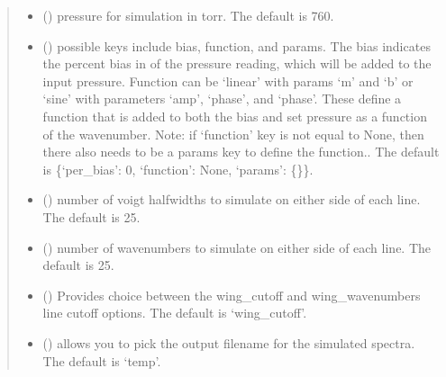 \documentclass[letterpaper,10pt,english]{sphinxmanual}
\begin{document}
\begin{fulllineitems}
\begin{quote}
\begin{description}
\begin{itemize}
\item {} 
\sphinxAtStartPar
{} (\sphinxstyleliteralemphasis{\sphinxupquote{, }}) \textendash{} pressure for simulation in torr. The default is 760.

\item {} 
\sphinxAtStartPar
{} (\sphinxstyleliteralemphasis{\sphinxupquote{, }}) \textendash{} possible keys include bias, function, and params. The bias indicates the percent bias in of the pressure reading, which will be added to the input pressure. Function can be ‘linear’ with params ‘m’ and ‘b’ or ‘sine’ with parameters ‘amp’, ‘phase’, and ‘phase’. These define a function that is added to both the bias and set pressure as a function of the wavenumber. Note: if ‘function’ key is not equal to None, then there also needs to be a params key to define the function.. The default is \{‘per\_bias’: 0, ‘function’: None, ‘params’: \{\}\}.

\item {} 
\sphinxAtStartPar
{} (\sphinxstyleliteralemphasis{\sphinxupquote{, }}) \textendash{} number of voigt half\sphinxhyphen{}widths to simulate on either side of each line. The default is 25.

\item {} 
\sphinxAtStartPar
{} (\sphinxstyleliteralemphasis{\sphinxupquote{, }}) \textendash{} number of wavenumbers to simulate on either side of each line. The default is 25.

\item {} 
\sphinxAtStartPar
{} (\sphinxstyleliteralemphasis{\sphinxupquote{, }}) \textendash{} Provides choice between the wing\_cutoff and wing\_wavenumbers line cut\sphinxhyphen{}off options. The default is ‘wing\_cutoff’.

\item {} 
\sphinxAtStartPar
{} (\sphinxstyleliteralemphasis{\sphinxupquote{, }}) \textendash{} allows you to pick the output filename for the simulated spectra. The default is ‘temp’.


\end{itemize}
\end{description}
\end{quote}
\end{fulllineitems}
\end{document}
